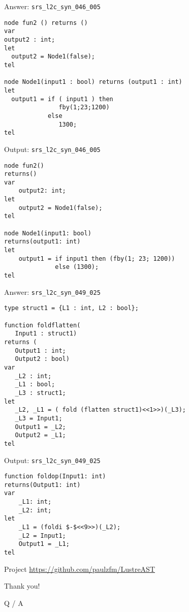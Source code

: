 \documentclass{beamer}
\begin{document}
\begin{frame}[fragile]{Answer: \texttt{srs\_l2c\_syn\_046\_005}}
    \begin{lstlisting}
node fun2 () returns ()
var
output2 : int;
let
  output2 = Node1(false);
tel

node Node1(input1 : bool) returns (output1 : int)
let
  output1 = if ( input1 ) then
               fby(1;23;1200)
            else
               1300;
tel
    \end{lstlisting}
\end{frame}

\begin{frame}[fragile]{Output: \texttt{srs\_l2c\_syn\_046\_005}}
    \begin{lstlisting}
node fun2()
returns()
var
    output2: int;
let
    output2 = Node1(false);
tel

node Node1(input1: bool)
returns(output1: int)
let
    output1 = if input1 then (fby(1; 23; 1200))
              else (1300);
tel
    \end{lstlisting}
\end{frame}

\begin{frame}[fragile]{Answer: \texttt{srs\_l2c\_syn\_049\_025}}
    \begin{lstlisting}
type struct1 = {L1 : int, L2 : bool};

function foldflatten(
   Input1 : struct1)
returns (
   Output1 : int;
   Output2 : bool)
var
   _L2 : int;
   _L1 : bool;
   _L3 : struct1;
let
   _L2, _L1 = ( fold (flatten struct1)<<1>>)(_L3);
   _L3 = Input1;
   Output1 = _L2;
   Output2 = _L1;
tel
    \end{lstlisting}
\end{frame}

\begin{frame}[fragile]{Output: \texttt{srs\_l2c\_syn\_049\_025}}
    \begin{lstlisting}
function foldop(Input1: int)
returns(Output1: int)
var
    _L1: int;
    _L2: int;
let
    _L1 = (foldi $-$<<9>>)(_L2);
    _L2 = Input1;
    Output1 = _L1;
tel
    \end{lstlisting}
\end{frame}

\begin{frame}{Project}
    \url{https://github.com/paulzfm/LustreAST}
\end{frame}

\begin{frame}
    \begin{center}
        {\huge \color{blue!75}
            Thank you!

            Q / A
        }
    \end{center}
\end{frame}
\end{document}

